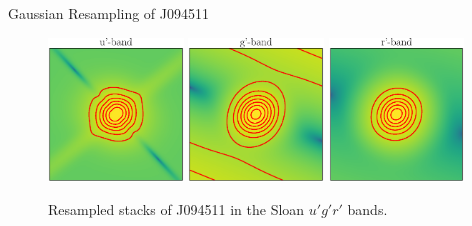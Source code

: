 \documentclass[final]{beamer}
\newlength{\colwidth}
\begin{document}
\begin{frame}[t]
\begin{columns}[t]
\begin{column}{\colwidth}
\begin{block}{\LARGE Gaussian Resampling of J094511}
\begin{figure}[h!]
    \includegraphics[width=0.32\textwidth]{J094511_U_resampled_stack.eps}
    \includegraphics[width=0.32\textwidth]{J094511_G_resampled_stack.eps}
    \includegraphics[width=0.32\textwidth]{J094511_R_resampled_stack.eps}
    \caption{\Large Resampled stacks of J094511 in the Sloan $u'g'r'$ bands.}
    \label{fig:resampled_stacks}
\end{figure}
\end{block}


\end{column}
\end{columns}
\end{frame}
\end{document}

